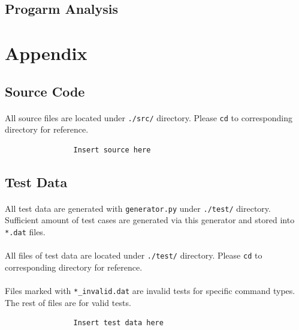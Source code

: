 \documentclass{article}
\begin{document}
        \subsection{Progarm Analysis}
            
    \cleardoublepage
    \section{Appendix}
        \subsection{Source Code}
            \paragraph{}
                All source files are located under \texttt{./src/} directory. Please \texttt{cd}
                to corresponding directory for reference.
            \begin{verbatim}
                Insert source here
            \end{verbatim}
        \subsection{Test Data}
            \paragraph{}
                All test data are generated with \texttt{generator.py} under \texttt{./test/}
                directory. Sufficient amount of test cases are generated via this generator
                and stored into \texttt{*.dat} files.
            \paragraph{}
                All files of test data are located under \texttt{./test/} directory. Please
                \texttt{cd} to corresponding directory for reference.
            \paragraph{}
                Files marked with \texttt{*\_invalid.dat} are invalid tests for specific command
                types. The rest of files are for valid tests.
            \begin{verbatim}
                Insert test data here
            \end{verbatim}
\end{document}
